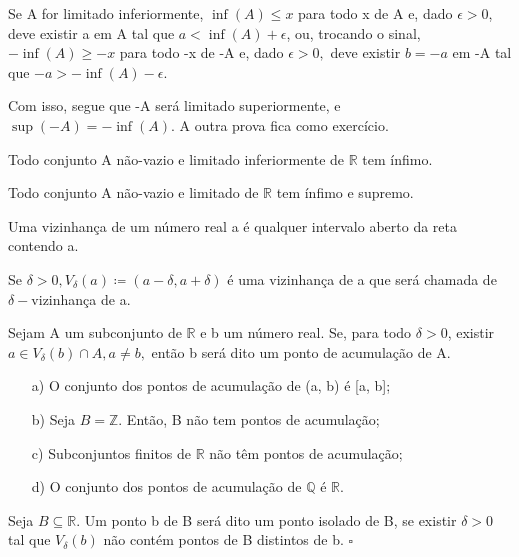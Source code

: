 \documentclass[analysis_notes.tex]{subfiles}
\begin{document}
\begin{proof*}
	Se A for limitado inferiormente, $\inf{(A)} \leq{x}$ para todo x de A e, dado $\epsilon > 0$, deve existir a em A tal que
	$a < \inf{(A)} + \epsilon$, ou, trocando o sinal, $-\inf{(A)} \geq{-x}$ para todo -x de -A e, dado $\epsilon > 0,$ deve existir
	$b = -a$ em -A tal que $-a > -\inf{(A)} - \epsilon.$

	Com isso, segue que -A ser\'a limitado superiormente, e $\sup{(-A)} = -\inf{(A)}.$ A outra prova fica como exerc\'icio. \qedsymbol
\end{proof*}
\begin{crl*}
	Todo conjunto A n\~ao-vazio e limitado inferiormente de $\mathbb{R}$ tem \'infimo.
\end{crl*}
\begin{crl*}
	Todo conjunto A n\~ao-vazio e limitado de $\mathbb{R}$ tem \'infimo e supremo.
\end{crl*}
\begin{def*}
	Uma vizinhan\c ca de um n\'umero real a \'e qualquer intervalo aberto da reta contendo a.
\end{def*}
\begin{example}
	Se $\delta > 0, V_{\delta}(a)\coloneqq(a - \delta, a + \delta)$ \'e uma vizinhan\c ca de a que ser\'a chamada de $\delta-$vizinhan\c ca de a.
\end{example}
\begin{def*}
	Sejam A um subconjunto de $\mathbb{R}$ e b um n\'umero real. Se, para todo $\delta > 0$, existir $a\in V_{\delta}(b)\cap{A}, a\neq b,$
	ent\~ao b ser\'a dito um ponto de acumula\c c\~ao de A.
\end{def*}
\begin{example}
	\begin{itemize}
		\item[a)]O conjunto dos pontos de acumula\c c\~ao de (a, b) \'e [a, b];
		\item[b)]Seja $B = \mathbb{Z}.$ Ent\~ao, B n\~ao tem pontos de acumula\c c\~ao;
		\item[c)] Subconjuntos finitos de $\mathbb{R}$ n\~ao t\^em pontos de acumula\c c\~ao;
		\item[d)] O conjunto dos pontos de acumula\c c\~ao de $\mathbb{Q}$ \'e $\mathbb{R}$.
	\end{itemize}
\end{example}
\begin{def*}
	Seja $B\subseteq{\mathbb{R}}$. Um ponto b de B ser\'a dito um ponto isolado de B, se existir $\delta > 0$ tal que $V_{\delta}(b)$
	n\~ao cont\'em pontos de B distintos de b. $\square$
\end{def*}
\end{document}
